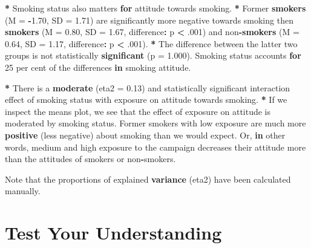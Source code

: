 \documentclass[a4paper]{book}
\newenvironment{Shaded}{\begin{snugshade}}{\end{snugshade}}
\newcommand{\KeywordTok}[1]{\textcolor[rgb]{0,0,0}{\textbf{#1}}}
\newcommand{\DataTypeTok}[1]{\textcolor[rgb]{0,0,0}{#1}}
\newcommand{\DecValTok}[1]{\textcolor[rgb]{0.00,0.00,0.00}{#1}}
\newcommand{\FloatTok}[1]{\textcolor[rgb]{0.00,0.00,0.00}{#1}}
\newcommand{\StringTok}[1]{\textcolor[rgb]{0.00,0.00,0.00}{#1}}
\newcommand{\ControlFlowTok}[1]{\textcolor[rgb]{0.00,0.00,0.00}{\textbf{#1}}}
\newcommand{\OperatorTok}[1]{\textcolor[rgb]{0.00,0.00,0.00}{\textbf{#1}}}
\newcommand{\NormalTok}[1]{#1}
\theoremstyle{definition}
\theoremstyle{definition}
\theoremstyle{definition}
\theoremstyle{remark}
\begin{document}
\begin{Shaded}
\begin{Highlighting}[]
\OperatorTok{*}\StringTok{ }\NormalTok{Smoking status also matters }\ControlFlowTok{for}\NormalTok{ attitude towards smoking.   }
\OperatorTok{*}\StringTok{ }\NormalTok{Former }\KeywordTok{smokers}\NormalTok{ (}\DataTypeTok{M =} \OperatorTok{-}\FloatTok{1.70}\NormalTok{, }\DataTypeTok{SD =} \FloatTok{1.71}\NormalTok{) are significantly more negative  }
\NormalTok{towards smoking then }\KeywordTok{smokers}\NormalTok{ (}\DataTypeTok{M =} \FloatTok{0.80}\NormalTok{, }\DataTypeTok{SD =} \FloatTok{1.67}\NormalTok{, difference}\OperatorTok{:}\StringTok{ }\NormalTok{p }\OperatorTok{<}\StringTok{ }\NormalTok{.}\DecValTok{001}\NormalTok{) and  }
\NormalTok{non}\OperatorTok{-}\KeywordTok{smokers}\NormalTok{ (}\DataTypeTok{M =} \FloatTok{0.64}\NormalTok{, }\DataTypeTok{SD =} \FloatTok{1.17}\NormalTok{, difference}\OperatorTok{:}\StringTok{ }\NormalTok{p }\OperatorTok{<}\StringTok{ }\NormalTok{.}\DecValTok{001}\NormalTok{).  }
\OperatorTok{*}\StringTok{ }\NormalTok{The difference between the latter two groups is not statistically  }
\KeywordTok{significant}\NormalTok{ (}\DataTypeTok{p =} \FloatTok{1.000}\NormalTok{). Smoking status accounts }\ControlFlowTok{for} \DecValTok{25}\NormalTok{ per cent of the  }
\NormalTok{differences }\ControlFlowTok{in}\NormalTok{ smoking attitude.  }
  
\OperatorTok{*}\StringTok{ }\NormalTok{There is a }\KeywordTok{moderate}\NormalTok{ (}\DataTypeTok{eta2 =} \FloatTok{0.13}\NormalTok{) and statistically significant interaction  }
\NormalTok{effect of smoking status with exposure on attitude towards smoking.  }
\OperatorTok{*}\StringTok{ }\NormalTok{If we inspect the means plot, we see that the effect of exposure on attitude}
\NormalTok{is moderated by smoking status. Former smokers with low exposure are much more}
\KeywordTok{positive}\NormalTok{ (less negative) about smoking than we would expect. Or, }\ControlFlowTok{in}\NormalTok{ other}
\NormalTok{words, medium and high exposure to the campaign decreases their attitude more}
\NormalTok{than the attitudes of smokers or non}\OperatorTok{-}\NormalTok{smokers.}
  
\NormalTok{Note that the proportions of explained }\KeywordTok{variance}\NormalTok{ (eta2) have been calculated  }
\NormalTok{manually.  }
\end{Highlighting}
\end{Shaded}

\section{Test Your Understanding}\label{test-your-understanding-6}
\end{document}
